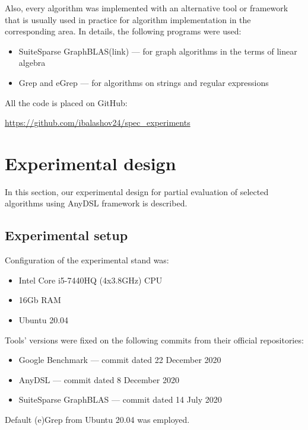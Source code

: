 \documentclass[conference]{IEEEtran}
\begin{document}
Also, every algorithm was implemented with an alternative tool or framework that is usually used in practice for algorithm implementation in the corresponding area. In details, the following programs were used:
\begin{itemize}
	\item SuiteSparse GraphBLAS(link) --- for graph algorithms in the terms of linear algebra
	\item Grep and eGrep --- for algorithms on strings and regular expressions
\end{itemize}


All the code is placed on GitHub:
\begin{center}
\href{https://github.com/ibalashov24/spec\_experiments}{https://github.com/ibalashov24/spec\_experiments}
\end{center}

\section{Experimental design}

In this section, our experimental design for partial evaluation of selected algorithms using AnyDSL framework is described.

\subsection{Experimental setup}

Configuration of the experimental stand was:
\begin{itemize}
	\item Intel Core i5-7440HQ (4x3.8GHz) CPU
	\item 16Gb RAM
	\item Ubuntu 20.04
\end{itemize}

Tools' versions were fixed on the following commits from their official repositories:
\begin{itemize}
	\item Google Benchmark \cite{gbenchmark} --- commit dated 22 December 2020
	\item AnyDSL \cite{leissa2018anydsl} --- commit dated 8 December 2020
	\item SuiteSparse GraphBLAS \colorbox{red}{\cite{moreira2018implementing}} --- commit dated 14 July 2020
\end{itemize}

Default (e)Grep from Ubuntu 20.04 was employed.
\end{document}
